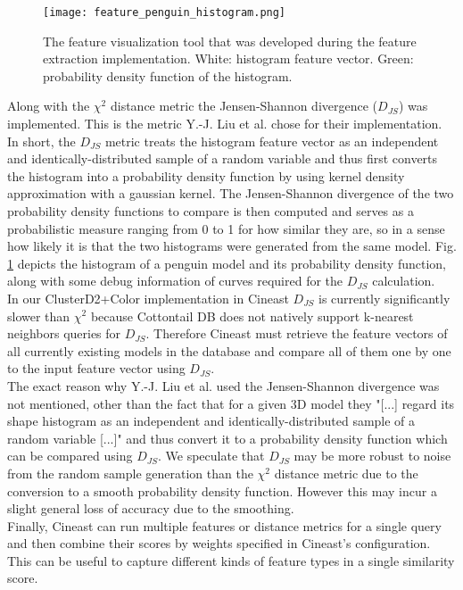\begin{figure}
\centering
\captionsetup{width=0.8\textwidth}
\texttt{[image: feature\_penguin\_histogram.png]}
\caption{The feature visualization tool that was developed during the feature extraction implementation. White: histogram feature vector. Green: probability density function of the histogram.}
\label{fig:feature_penguin_histogram}
\end{figure}

Along with the $\chi^2$ distance metric the Jensen-Shannon divergence ($D_{JS}$) was implemented. This is the metric Y.-J. Liu et al. \cite{cluster_d2_color} chose for their implementation. In short, the $D_{JS}$ metric treats the histogram feature vector as an independent and identically-distributed sample of a random variable and thus first converts the histogram into a probability density function by using kernel density approximation with a gaussian kernel. The Jensen-Shannon divergence of the two probability density functions to compare is then computed and serves as a probabilistic measure ranging from 0 to 1 for how similar they are, so in a sense how likely it is that the two histograms were generated from the same model. Fig. \ref{fig:feature_penguin_histogram} depicts the histogram of a penguin model and its probability density function, along with some debug information of curves required for the $D_{JS}$ calculation.\\
In our ClusterD2+Color implementation in Cineast $D_{JS}$ is currently significantly slower than $\chi^2$ because Cottontail DB does not natively support k-nearest neighbors queries for $D_{JS}$. Therefore Cineast must retrieve the feature vectors of all currently existing models in the database and compare all of them one by one to the input feature vector using $D_{JS}$.\\
The exact reason why Y.-J. Liu et al. used the Jensen-Shannon divergence was not mentioned, other than the fact that for a given 3D model they "[...] regard its shape histogram as an independent and identically-distributed sample of a random variable [...]" \cite{cluster_d2_color} and thus convert it to a probability density function which can be compared using $D_{JS}$. We speculate that $D_{JS}$ may be more robust to noise from the random sample generation than the $\chi^2$ distance metric due to the conversion to a smooth probability density function. However this may incur a slight general loss of accuracy due to the smoothing.\\
Finally, Cineast can run multiple features or distance metrics for a single query and then combine their scores by weights specified in Cineast's configuration. This can be useful to capture different kinds of feature types in a single similarity score.


